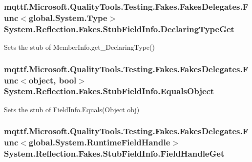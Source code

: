 \hypertarget{class_system_1_1_reflection_1_1_fakes_1_1_stub_field_info_a1a65c583540c41add9d9ecf26ae1409a}{
\subsubsection[{Declaring\-Type\-Get}]{\setlength{\rightskip}{0pt plus 5cm}mqttf.\-Microsoft.\-Quality\-Tools.\-Testing.\-Fakes.\-Fakes\-Delegates.\-Func$<$global.\-System.\-Type$>$ System.\-Reflection.\-Fakes.\-Stub\-Field\-Info.\-Declaring\-Type\-Get}}\label{class_system_1_1_reflection_1_1_fakes_1_1_stub_field_info_a1a65c583540c41add9d9ecf26ae1409a}


Sets the stub of Member\-Info.\-get\-\_\-\-Declaring\-Type()

\hypertarget{class_system_1_1_reflection_1_1_fakes_1_1_stub_field_info_a8552b53a5befc4f4ae6679f4123e9e3d}{
\subsubsection[{Equals\-Object}]{\setlength{\rightskip}{0pt plus 5cm}mqttf.\-Microsoft.\-Quality\-Tools.\-Testing.\-Fakes.\-Fakes\-Delegates.\-Func$<$object, bool$>$ System.\-Reflection.\-Fakes.\-Stub\-Field\-Info.\-Equals\-Object}}\label{class_system_1_1_reflection_1_1_fakes_1_1_stub_field_info_a8552b53a5befc4f4ae6679f4123e9e3d}


Sets the stub of Field\-Info.\-Equals(\-Object obj)

\hypertarget{class_system_1_1_reflection_1_1_fakes_1_1_stub_field_info_adb9d8a5db423458e8dcdf55419c2a365}{
\subsubsection[{Field\-Handle\-Get}]{\setlength{\rightskip}{0pt plus 5cm}mqttf.\-Microsoft.\-Quality\-Tools.\-Testing.\-Fakes.\-Fakes\-Delegates.\-Func$<$global.\-System.\-Runtime\-Field\-Handle$>$ System.\-Reflection.\-Fakes.\-Stub\-Field\-Info.\-Field\-Handle\-Get}}\label{class_system_1_1_reflection_1_1_fakes_1_1_stub_field_info_adb9d8a5db423458e8dcdf55419c2a365}


